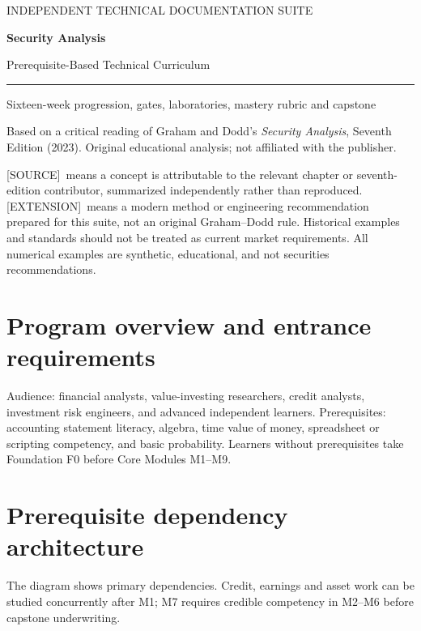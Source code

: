 \documentclass[11pt,letterpaper]{article}
\newcommand{\src}{\textsf{\color{sea}[SOURCE]}}
\newcommand{\ext}{\textsf{\color{gold}[EXTENSION]}}
\newcommand{\cover}[3]{%
\hypersetup{pageanchor=false}%
\begin{titlepage}\pagecolor{ink}\color{white}\vspace*{1.15in}
{\sffamily\large\color{gold}INDEPENDENT TECHNICAL DOCUMENTATION SUITE\par}\vspace{0.4in}
{\Huge\sffamily\bfseries #1\par}\vspace{0.15in}
{\Large\sffamily #2\par}\vspace{0.65in}
\color{gold}\rule{\textwidth}{2pt}\par\vspace{0.4in}
{\large #3\par}\vfill
{\small\sffamily Based on a critical reading of Graham and Dodd's \emph{Security Analysis}, Seventh Edition (2023). Original educational analysis; not affiliated with the publisher.\par}
\end{titlepage}\hypersetup{pageanchor=true}\nopagecolor\color{black}}
\newcommand{\front}[3]{\cover{#1}{#2}{#3}\tableofcontents\clearpage
\begin{sourcebox}\src\ means a concept is attributable to the relevant chapter or seventh-edition contributor, summarized independently rather than reproduced. \ext\ means a modern method or engineering recommendation prepared for this suite, not an original Graham--Dodd rule. Historical examples and standards should not be treated as current market requirements. All numerical examples are synthetic, educational, and not securities recommendations.\end{sourcebox}}
\begin{document}
\front{Security Analysis}{Prerequisite-Based Technical Curriculum}{Sixteen-week progression, gates, laboratories, mastery rubric and capstone}

\section{Program overview and entrance requirements}
Audience: financial analysts, value-investing researchers, credit analysts, investment risk engineers, and advanced independent learners. Prerequisites: accounting statement literacy, algebra, time value of money, spreadsheet or scripting competency, and basic probability. Learners without prerequisites take Foundation F0 before Core Modules M1--M9.

\section{Prerequisite dependency architecture}
\begin{center}\end{center}
The diagram shows primary dependencies. Credit, earnings and asset work can be studied concurrently after M1; M7 requires credible competency in M2--M6 before capstone underwriting.
\end{document}
